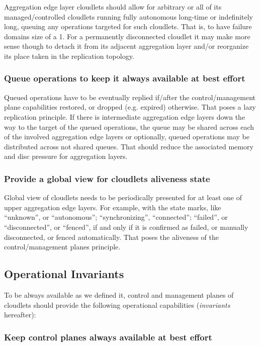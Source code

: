 \documentclass[conference]{IEEEtran}
\begin{document}
Aggregation edge layer cloudlets should allow for arbitrary or all of its
managed/controlled cloudlets running fully autonomous long-time or indefinitely
long, queuing any operations targeted for such cloudlets. That is, to have
failure domains size of a 1. For a permanently disconnected cloudlet it may make
more sense though to detach it from its adjacent aggregation layer and/or
reorganize its place taken in the replication topology.

\subsubsection{Queue operations to keep it always available at best
effort}

Queued operations have to be eventually replied if/after the control/management
plane capabilities restored, or dropped (e.g. expired) otherwise. That poses a
lazy replication principle. If there is intermediate aggregation edge layers
down the way to the target of the queued operations, the queue may be shared
across each of the involved aggregation edge layers or optionally,
queued operations may be distributed across not shared queues. That should
reduce the associated memory and disc pressure for aggregation layers.

\subsubsection{Provide a global view for cloudlets aliveness state}

Global view of cloudlets needs to be periodically presented for at least one of
upper aggregation edge layers. For example, with
the state marks, like ``unknown'', or ``autonomous''; ``synchronizing'',
``connected''; ``failed'', or ``disconnected'', or ``fenced'', if and only if
it is confirmed as failed, or manually disconnected, or fenced automatically.
That poses the aliveness of the control/management planes principle.

\subsection{Operational Invariants}

To be always available as we defined it, control and management planes of
cloudlets should provide the following operational capabilities
(\textit{invariants} hereafter):

\subsubsection{Keep control planes always available at best effort}
\end{document}
